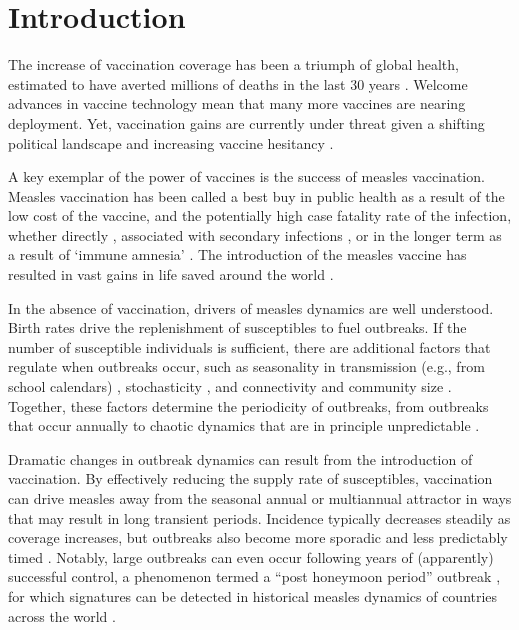 \section{Introduction}
\label{sec:introduction}

The increase of vaccination coverage has been a triumph of global health, estimated to have averted millions of deaths in the last 30 years \citep{ToorEtAl2021}. Welcome advances in vaccine technology mean that many more vaccines are nearing deployment. Yet, vaccination gains are currently under threat given a shifting political landscape and increasing vaccine hesitancy \citep{OliveEtAl2018}.

A key exemplar of the power of vaccines is the success of measles vaccination. Measles vaccination has been called a best buy in public health as a result of the low cost of the vaccine, and the potentially high case fatality rate of the infection, whether directly \citep{PortnoyEtAl2019}, associated with secondary infections \citep{XiaEtAl2023}, or in the longer term as a result of `immune amnesia' \citep{MinaEtAl2015}. The introduction of the measles vaccine has resulted in vast gains in life saved around the world \citep{ToorEtAl2021}.

In the absence of vaccination, drivers of measles dynamics are well understood. Birth rates drive the replenishment of susceptibles to fuel outbreaks. If the number of susceptible individuals is sufficient, there are additional factors that regulate when outbreaks occur, such as seasonality in transmission (e.g., from school calendars) \citep{FineClarkson1982,BjornstadEtAl2002}, stochasticity \citep{Bartlett1960}, and connectivity and community size \citep{BjornstadGrenfell2008}. Together, these factors determine the periodicity of outbreaks, from outbreaks that occur annually to chaotic dynamics that are in principle unpredictable \citep{FerrariEtAl2008,DalzielEtAl2016}.

Dramatic changes in outbreak dynamics can result from the introduction of vaccination. By effectively reducing the supply rate of susceptibles, vaccination can drive measles away from the seasonal annual or multiannual attractor in ways that may result in long transient periods. Incidence typically decreases steadily as coverage increases, but outbreaks also become more sporadic and less predictably timed \citep{GrahamEtAl2019}. Notably, large outbreaks can even occur following years of (apparently) successful control, a phenomenon termed a ``post honeymoon period'' outbreak \citep{McLeanAnderson1988}, for which signatures can be detected in historical measles dynamics of countries across the world \citep{MetcalfEtAl2020}.

